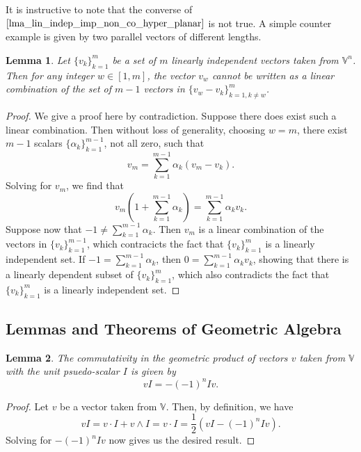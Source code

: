 \documentclass{article}
\newcommand{\V}{\mathbb{V}}
\newtheorem{lemma}{Lemma}[section]
\begin{document}
It is instructive to note that the converse of $\eqref{lma_lin_indep_imp_non_co_hyper_planar}$
is not true.
A simple counter example is given by two parallel vectors of different lengths.

\begin{lemma}\label{lma_lin_indep_not_lin_combo_diff_vecs}
Let $\{v_k\}_{k=1}^m$ be a set of $m$ linearly independent vectors taken from $\V^n$.
Then for any integer $w\in[1,m]$, the vector $v_w$ cannot be written as a linear combination
of the set of $m-1$ vectors in $\{v_w-v_k\}_{k=1,k\neq w}^m$.
\end{lemma}
\begin{proof}
We give a proof here by contradiction.  Suppose there does exist such a linear combination.
Then without loss of generality, choosing $w=m$, there exist $m-1$ scalars $\{\alpha_k\}_{k=1}^{m-1}$,
not all zero, such that
\begin{equation*}
v_m = \sum_{k=1}^{m-1}\alpha_k(v_m-v_k).
\end{equation*}
Solving for $v_m$, we find that
\begin{equation*}
v_m\left(1+\sum_{k=1}^{m-1}\alpha_k\right) = \sum_{k=1}^{m-1}\alpha_k v_k.
\end{equation*}
Suppose now that $-1\neq\sum_{k=1}^{m-1}\alpha_k$.  Then $v_m$ is a
linear combination of the vectors in $\{v_k\}_{k=1}^{m-1}$, which
contracicts the fact that $\{v_k\}_{k=1}^m$ is a linearly independent set.
If $-1=\sum_{k=1}^{m-1}\alpha_k$, then $0=\sum_{k=1}^{m-1}\alpha_k v_k$,
showing that there is a linearly dependent subset of $\{v_k\}_{k=1}^m$,
which also contradicts the fact that $\{v_k\}_{k=1}^m$ is a linearly
independent set.
\end{proof}

\subsection{Lemmas and Theorems of Geometric Algebra}\label{sec_thms_of_geo_alg}

\begin{lemma}\label{lma_psuedo_scalar_with_vec_commutativity}
The commutativity in the geometric product of vectors $v$ taken from $\V$ with the
unit psuedo-scalar $I$ is given by
\begin{equation*}
vI = -(-1)^nIv.
\end{equation*}
\end{lemma}
\begin{proof}
Let $v$ be a vector taken from $\V$.
Then, by definition, we have
\begin{equation*}
vI=v\cdot I+v\wedge I=v\cdot I=\frac{1}{2}(vI-(-1)^nIv).
\end{equation*}
Solving for $-(-1)^nIv$ now gives us the desired result.
\end{proof}
\end{document}
